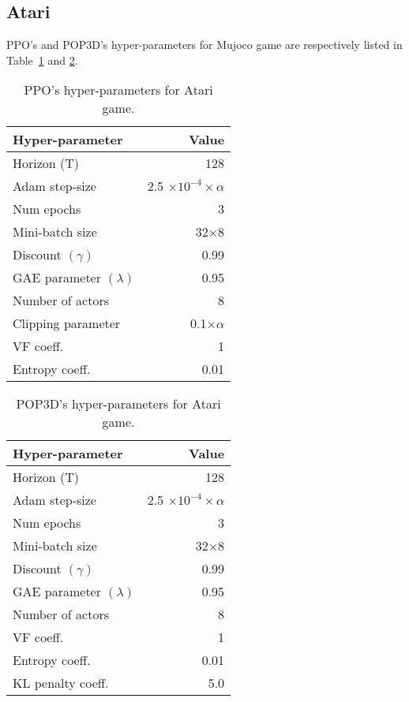 \documentclass{article}
\begin{document}
\subsection{Atari}\label{hyper-atari}
PPO's and  POP3D's hyper-parameters for Mujoco game are respectively listed in Table~\ref{PPO-Atari-game-hyperparameter} and \ref{POP3D-Atari-game-hyperparameter}.
\begin{table}[ht]
	\begin{center}
		\begin{tabular}{lr}
			\toprule
			Hyper-parameter & Value \\
			\midrule
			Horizon (T)    &128 \\
			Adam step-size &2.5 $\times10^{-4}\times\alpha$\\
			Num epochs    & 3 \\
			Mini-batch size    & 32$\times8$\\
			Discount $(\gamma)$     & 0.99\\
			GAE parameter $(\lambda)$      & 0.95 \\
			Number of actors      & 8\\
			Clipping parameter   & 0.1$\times\alpha$ \\
			VF coeff. &1 \\
			Entropy coeff. &0.01 \\
			\bottomrule
		\end{tabular}
	\end{center}
	\caption{PPO's hyper-parameters for Atari game.}
	\label{PPO-Atari-game-hyperparameter}
\end{table}

\begin{table}[ht]
	\begin{center}
		\begin{tabular}{lr}
			\toprule
			Hyper-parameter & Value \\
			\midrule
			Horizon (T)    &128 \\
			Adam step-size &2.5 $\times10^{-4}\times\alpha$\\
			Num epochs    & 3 \\
			Mini-batch size    & 32$\times8$\\
			Discount $(\gamma)$     & 0.99\\
			GAE parameter $(\lambda)$      & 0.95 \\
			Number of actors      & 8\\
			VF coeff. &1 \\
			Entropy coeff. &0.01 \\
			KL penalty coeff. &5.0 \\
			\bottomrule
		\end{tabular}
	\end{center}
	\caption{POP3D's hyper-parameters for Atari game.}
	\label{POP3D-Atari-game-hyperparameter}
\end{table}
\end{document}
